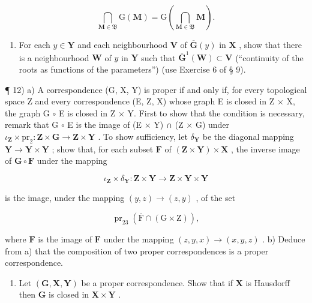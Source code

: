 \[
\bigcap_ {\mathbf {M} \in \mathfrak {B}} \mathrm{G} (\mathbf {M}) = \mathrm{G} \left(\bigcap_ {\mathbf {M} \in \mathfrak {B}} \mathbf {M}\right).
\]

\begin{enumerate}
\def\labelenumi{\alph{enumi})}
\setcounter{enumi}{1}
\tightlist
\item
  For each \(y \in \mathbf{Y}\) and each neighbourhood \(\mathbf{V}\) of \(\overline{\mathbf{G}}(y)\) in \(\mathbf{X}\) , show that there is a neighbourhood \(\mathbf{W}\) of \(y\) in \(\mathbf{Y}\) such that \(\overline{\mathbf{G}}^{1}(\mathbf{W}) \subset \mathbf{V}\) (``continuity of the roots as functions of the parameters'') (use Exercise 6 of § 9).
\end{enumerate}

¶ 12) a) A correspondence (G, X, Y) is proper if and only if, for every topological space Z and every correspondence (E, Z, X) whose graph E is closed in Z × X, the graph G \(\circ\) E is closed in Z × Y. First to show that the condition is necessary, remark that G \(\circ\) E is the image of (E × Y) ∩ (Z × G) under \(\iota_{\mathbf{Z}} \times \mathrm{pr}_{2} : \mathbf{Z} \times \mathbf{G} \to \mathbf{Z} \times \mathbf{Y}\) . To show sufficiency, let \(\delta_{\mathbf{Y}}\) be the diagonal mapping \(\mathbf{Y} \to \mathbf{Y} \times \mathbf{Y}\) ; show that, for each subset \(\mathbf{F}\) of \((\mathbf{Z} \times \mathbf{Y}) \times \mathbf{X}\) , the inverse image of \(\mathbf{G} \circ \mathbf{F}\) under the mapping

\[
\iota_ {\mathbf {Z}} \times \delta_ {\mathbf {Y}}: \mathbf {Z} \times \mathbf {Y} \rightarrow \mathbf {Z} \times \mathbf {Y} \times \mathbf {Y}
\]

is the image, under the mapping \((y, z) \to (z, y)\) , of the set

\[
\operatorname{pr} _ {2 3} (\overline {{{\mathrm{F}}}} \cap (\mathrm{G} \times \mathrm{Z})),
\]

where \(\mathbf{F}\) is the image of \(\mathbf{F}\) under the mapping \((z, y, x) \to (x, y, z)\) . b) Deduce from a) that the composition of two proper correspondences is a proper correspondence.

\begin{enumerate}
\def\labelenumi{\alph{enumi})}
\setcounter{enumi}{2}
\tightlist
\item
  Let \((\mathbf{G},\mathbf{X},\mathbf{Y})\) be a proper correspondence. Show that if \(\mathbf{X}\) is Hausdorff then \(\mathbf{G}\) is closed in \(\mathbf{X} \times \mathbf{Y}\) .
\end{enumerate}

